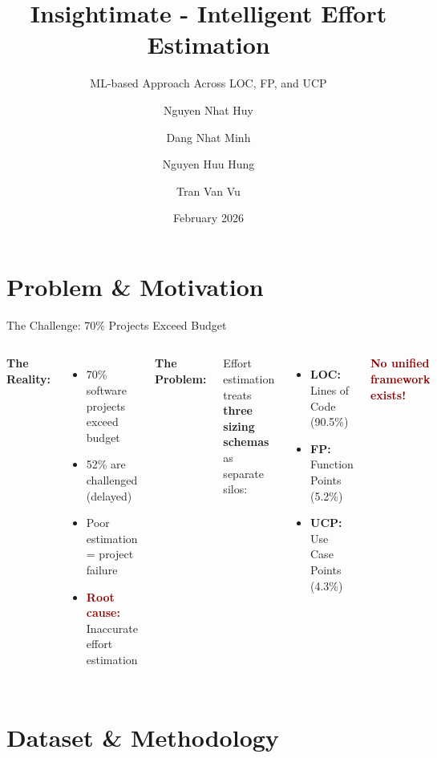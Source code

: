\documentclass[aspectratio=169]{beamer}
\title[Insightimate]{Insightimate - Intelligent Effort Estimation}
\subtitle{ML-based Approach Across LOC, FP, and UCP}
\author[Huy, Minh, Hung, Vu]{\small Nguyen Nhat Huy \and Dang Nhat Minh \and Nguyen Huu Hung \and Tran Van Vu}
\institute[PTIT]{\small Posts and Telecommunications Institute of Technology}
\date{February 2026}
\begin{document}
\begin{frame}
\titlepage
\end{frame}

\section{Problem \& Motivation}

\begin{frame}{The Challenge: 70\% Projects Exceed Budget}
\begin{columns}[T]
\textbf{The Reality:}
\begin{itemize}
    \item 70\% software projects exceed budget
    \item 52\% are challenged (delayed)
    \item Poor estimation = project failure
    \item \textcolor{darkred}{\textbf{Root cause:}} Inaccurate effort estimation
\end{itemize}

\textbf{The Problem:}

\vspace{0.5cm}
Effort estimation treats \textbf{three sizing schemas} as separate silos:
\begin{itemize}
    \item \textbf{LOC:} Lines of Code (90.5\%)
    \item \textbf{FP:} Function Points (5.2\%)
    \item \textbf{UCP:} Use Case Points (4.3\%)
\end{itemize}

\vspace{0.5cm}
\textcolor{darkred}{\textbf{No unified framework exists!}}
\end{columns}
\end{frame}

\section{Dataset \& Methodology}
\end{document}
